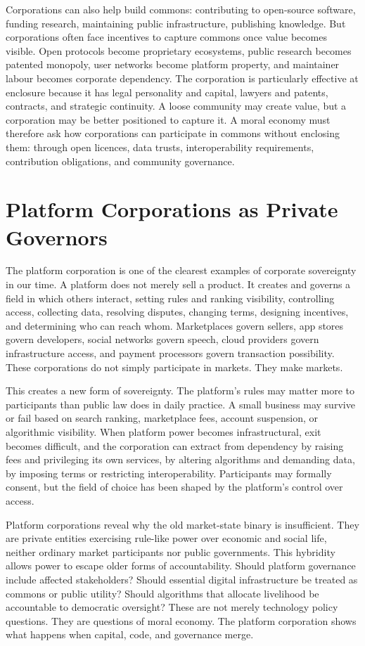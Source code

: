 \documentclass[11pt,a4paper,oneside]{book}
\begin{document}
Corporations can also help build commons: contributing to open-source software, funding research, maintaining public infrastructure, publishing knowledge. But corporations often face incentives to capture commons once value becomes visible. Open protocols become proprietary ecosystems, public research becomes patented monopoly, user networks become platform property, and maintainer labour becomes corporate dependency. The corporation is particularly effective at enclosure because it has legal personality and capital, lawyers and patents, contracts, and strategic continuity. A loose community may create value, but a corporation may be better positioned to capture it. A moral economy must therefore ask how corporations can participate in commons without enclosing them: through open licences, data trusts, interoperability requirements, contribution obligations, and community governance.

\section*{Platform Corporations as Private Governors}

The platform corporation is one of the clearest examples of corporate sovereignty in our time. A platform does not merely sell a product. It creates and governs a field in which others interact, setting rules and ranking visibility, controlling access, collecting data, resolving disputes, changing terms, designing incentives, and determining who can reach whom. Marketplaces govern sellers, app stores govern developers, social networks govern speech, cloud providers govern infrastructure access, and payment processors govern transaction possibility. These corporations do not simply participate in markets. They make markets.

This creates a new form of sovereignty. The platform's rules may matter more to participants than public law does in daily practice. A small business may survive or fail based on search ranking, marketplace fees, account suspension, or algorithmic visibility. When platform power becomes infrastructural, exit becomes difficult, and the corporation can extract from dependency by raising fees and privileging its own services, by altering algorithms and demanding data, by imposing terms or restricting interoperability. Participants may formally consent, but the field of choice has been shaped by the platform's control over access.

Platform corporations reveal why the old market-state binary is insufficient. They are private entities exercising rule-like power over economic and social life, neither ordinary market participants nor public governments. This hybridity allows power to escape older forms of accountability. Should platform governance include affected stakeholders? Should essential digital infrastructure be treated as commons or public utility? Should algorithms that allocate livelihood be accountable to democratic oversight? These are not merely technology policy questions. They are questions of moral economy. The platform corporation shows what happens when capital, code, and governance merge.
\end{document}
